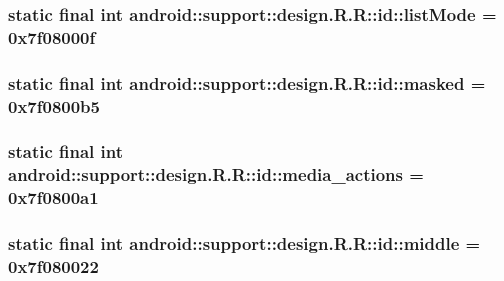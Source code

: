 \hypertarget{classandroid_1_1support_1_1design_1_1_r_1_1id_6553f48252a68cafe8801348b9ad787b}{
\subsubsection[{listMode}]{\setlength{\rightskip}{0pt plus 5cm}static final int android::support::design.R.R::id::listMode = 0x7f08000f}}
\label{classandroid_1_1support_1_1design_1_1_r_1_1id_6553f48252a68cafe8801348b9ad787b}


\hypertarget{classandroid_1_1support_1_1design_1_1_r_1_1id_45e7be932a56b60432b36cd60dfe4625}{
\subsubsection[{masked}]{\setlength{\rightskip}{0pt plus 5cm}static final int android::support::design.R.R::id::masked = 0x7f0800b5}}
\label{classandroid_1_1support_1_1design_1_1_r_1_1id_45e7be932a56b60432b36cd60dfe4625}


\hypertarget{classandroid_1_1support_1_1design_1_1_r_1_1id_747fc82c6137ce405a9ef2207afc6850}{
\subsubsection[{media\_\-actions}]{\setlength{\rightskip}{0pt plus 5cm}static final int android::support::design.R.R::id::media\_\-actions = 0x7f0800a1}}
\label{classandroid_1_1support_1_1design_1_1_r_1_1id_747fc82c6137ce405a9ef2207afc6850}


\hypertarget{classandroid_1_1support_1_1design_1_1_r_1_1id_5259e3c5cd1752a3626f059d27cec4ce}{
\subsubsection[{middle}]{\setlength{\rightskip}{0pt plus 5cm}static final int android::support::design.R.R::id::middle = 0x7f080022}}
\label{classandroid_1_1support_1_1design_1_1_r_1_1id_5259e3c5cd1752a3626f059d27cec4ce}


